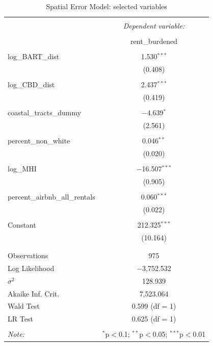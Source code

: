 \documentclass[10pt, letterpaper]{amsart}
\begin{document}
\begin{table}[!htbp] \centering 
  \caption{Spatial Error Model: selected variables} 
  \label{} 
  \begin{tabular}{@{\extracolsep{5pt}}lc} 
    \\[-1.8ex]\hline 
    \hline \\[-1.8ex] 
    & \multicolumn{1}{c}{\textit{Dependent variable:}} \\ 
    \cline{2-2} 
    \\[-1.8ex] & rent\_burdened \\ 
    \hline \\[-1.8ex] 
    log\_BART\_dist & 1.530$^{***}$ \\ 
    & (0.408) \\ 
    & \\ 
    log\_CBD\_dist & 2.437$^{***}$ \\ 
    & (0.419) \\ 
    & \\ 
    coastal\_tracts\_dummy & $-$4.639$^{*}$ \\ 
    & (2.561) \\ 
    & \\ 
    percent\_non\_white & 0.046$^{**}$ \\ 
    & (0.020) \\ 
    & \\ 
    log\_MHI & $-$16.507$^{***}$ \\ 
    & (0.905) \\ 
    & \\ 
    percent\_airbnb\_all\_rentals & 0.060$^{***}$ \\ 
    & (0.022) \\ 
    & \\ 
    Constant & 212.325$^{***}$ \\ 
    & (10.164) \\ 
    & \\ 
    \hline \\[-1.8ex] 
    Observations & 975 \\ 
    Log Likelihood & $-$3,752.532 \\ 
    $\sigma^{2}$ & 128.939 \\ 
    Akaike Inf. Crit. & 7,523.064 \\ 
    Wald Test & 0.599 (df = 1) \\ 
    LR Test & 0.625 (df = 1) \\ 
    \hline 
    \hline \\[-1.8ex] 
    \textit{Note:}  & \multicolumn{1}{r}{$^{*}$p$<$0.1; $^{**}$p$<$0.05; $^{***}$p$<$0.01} \\ 
  \end{tabular} 
\end{table} 
\end{document}
